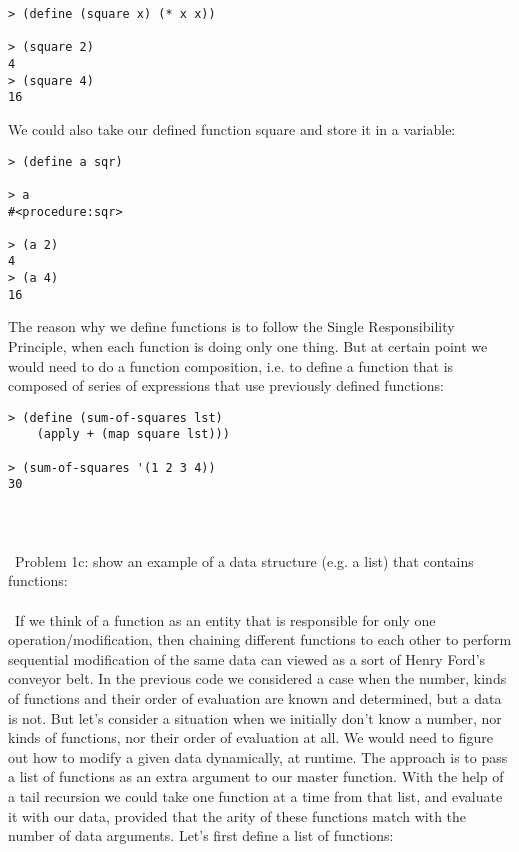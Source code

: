 \documentclass{article}
\begin{document}
\begin{verbatim} 
> (define (square x) (* x x))

> (square 2)
4
> (square 4)
16
\end{verbatim}

We could also take our defined function square and store it in a variable:

\begin{verbatim} 
> (define a sqr)

> a
#<procedure:sqr>

> (a 2)
4
> (a 4)
16
\end{verbatim}

The reason why we define functions is to follow the Single Responsibility Principle, when each function is doing only one thing. But at certain point we would need to do a function composition, i.e. to define a function that is composed of series of expressions that use previously defined functions:

\begin{verbatim} 
> (define (sum-of-squares lst)
    (apply + (map square lst)))
    
> (sum-of-squares '(1 2 3 4))
30
\end{verbatim}
\paragraph{}\
\paragraph{}\
Problem 1c: show an example of a data structure (e.g. a list) that contains functions:
\paragraph{}\
If we think of a function as an entity that is responsible for only one operation/modification, then chaining different functions to each other to perform sequential modification of the same data can viewed as a sort of Henry Ford's conveyor belt. In the previous code we considered a case when the number, kinds of functions and their order of evaluation are known and determined, but a data is not. But let's consider a situation when we initially don't know a number, nor kinds of functions, nor their order of evaluation at all. We would need to figure out how to modify a given data dynamically, at runtime. The approach is to pass a list of functions as an extra argument to our master function. With the help of a tail recursion we could take one function at a time from that list, and evaluate it with our data, provided that the arity of these functions match with the number of data arguments. Let's first define a list of functions:
\end{document}
